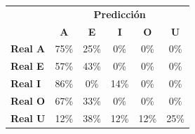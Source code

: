 \begin{tabular}{lccccc}
\toprule
 & \multicolumn{5}{c}{\textbf{Predicción}} \\
 & \textbf{A} & \textbf{E} & \textbf{I} & \textbf{O} & \textbf{U} \\
\midrule
\textbf{Real A} & \cellcolor[rgb]{0.48,0.48,1.00} \color{white} 75\% & \cellcolor[rgb]{0.82,0.82,1.00}  25\% & \cellcolor[rgb]{1.00,1.00,1.00}  0\% & \cellcolor[rgb]{1.00,1.00,1.00}  0\% & \cellcolor[rgb]{1.00,1.00,1.00}  0\% \\
\textbf{Real E} & \cellcolor[rgb]{0.60,0.60,1.00} \color{white} 57\% & \cellcolor[rgb]{0.70,0.70,1.00}  43\% & \cellcolor[rgb]{1.00,1.00,1.00}  0\% & \cellcolor[rgb]{1.00,1.00,1.00}  0\% & \cellcolor[rgb]{1.00,1.00,1.00}  0\% \\
\textbf{Real I} & \cellcolor[rgb]{0.40,0.40,1.00} \color{white} 86\% & \cellcolor[rgb]{1.00,1.00,1.00}  0\% & \cellcolor[rgb]{0.90,0.90,1.00}  14\% & \cellcolor[rgb]{1.00,1.00,1.00}  0\% & \cellcolor[rgb]{1.00,1.00,1.00}  0\% \\
\textbf{Real O} & \cellcolor[rgb]{0.53,0.53,1.00} \color{white} 67\% & \cellcolor[rgb]{0.77,0.77,1.00}  33\% & \cellcolor[rgb]{1.00,1.00,1.00}  0\% & \cellcolor[rgb]{1.00,1.00,1.00}  0\% & \cellcolor[rgb]{1.00,1.00,1.00}  0\% \\
\textbf{Real U} & \cellcolor[rgb]{0.91,0.91,1.00}  12\% & \cellcolor[rgb]{0.74,0.74,1.00}  38\% & \cellcolor[rgb]{0.91,0.91,1.00}  12\% & \cellcolor[rgb]{0.91,0.91,1.00}  12\% & \cellcolor[rgb]{0.82,0.82,1.00}  25\% \\
\bottomrule
\end{tabular}